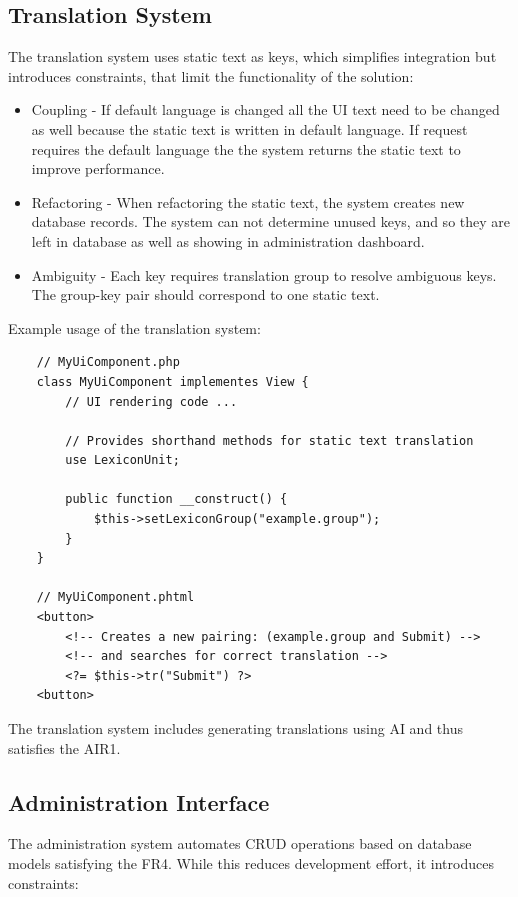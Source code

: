 \subsection{Translation System}\label{subsec:translation-system}
The translation system uses static text as keys, which simplifies integration but introduces constraints,
that limit the functionality of the solution:

\begin{itemize}
    \item Coupling - If default language is changed all the UI text need to be changed as well because the static text is written
        in default language.
        If request requires the default language the the system returns the static text to improve performance.
    \item Refactoring - When refactoring the static text, the system creates new database records.
        The system can not determine unused keys, and so they are left in database as well as showing in administration dashboard.
    \item Ambiguity - Each key requires translation group to resolve ambiguous keys.
        The group-key pair should correspond to one static text.
\end{itemize}

Example usage of the translation system:
\begin{verbatim}
    // MyUiComponent.php
    class MyUiComponent implementes View {
        // UI rendering code ...

        // Provides shorthand methods for static text translation
        use LexiconUnit;

        public function __construct() {
            $this->setLexiconGroup("example.group");
        }
    }

    // MyUiComponent.phtml
    <button>
        <!-- Creates a new pairing: (example.group and Submit) -->
        <!-- and searches for correct translation -->
        <?= $this->tr("Submit") ?>
    <button>
\end{verbatim}

The translation system includes generating translations using AI and thus satisfies the AIR1.



\subsection{Administration Interface}\label{subsec:administration-interface}
The administration system automates CRUD operations based on database models satisfying the FR4.
While this reduces development effort, it introduces constraints:

